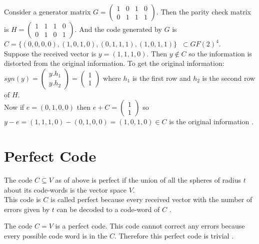 \begin{example}
  Consider a generator matrix \(G=\begin{pmatrix}
    1 & 0 & 1 & 0\\
    0 & 1 & 1 & 1
  \end{pmatrix}\). Then the parity check matrix is \(H=\begin{pmatrix}
    1 & 1 & 1 & 0\\
    0 & 1 & 0 & 1
  \end{pmatrix}\). And the code generated by \(G\) is  \(C=\{(0,0,0,0),(1,0,1,0),(0,1,1,1),(1,0,1,1)\} \;\; \subset GF(2)^{4}\).\\

  Suppose the received vector is \(y=(1,1,1,0)\). Then \(y \not \in C\) so the information is distorted from the original information. To get the original information:\\
  \(syn(y)= \begin{pmatrix}
    y.h_1 \\ y.h_2
  \end{pmatrix} = \begin{pmatrix}
    1 \\ 1
  \end{pmatrix}\) where \(h_1\) is the first row and \(h_2\) is the second row of \(H\).\\
  Now if \(e=(0,1,0,0)\) then \(e+C=\begin{pmatrix}
    1 \\ 1
  \end{pmatrix}\) so \(y-e=(1,1,1,0)-(0,1,0,0)=(1,0,1,0) \in C\) is the original information \cite{error_correct}.

\end{example}


\section{Perfect Code}
The code \(C \subseteq V\) as of above is perfect if the union of all the spheres of radius \(t\) about its code-words is the vector space \(V\).\\
This code is \(C\) is called perfect because every received vector with the number of errors given by \(t\) can be decoded to a code-word of \(C\) \cite{error_correct}.

\begin{example}
  The code \(C=V\) is a perfect code. This code cannot correct any errors because every possible code word is in the \(C\). Therefore this perfect code is trivial \cite{error_correct}.
\end{example}

